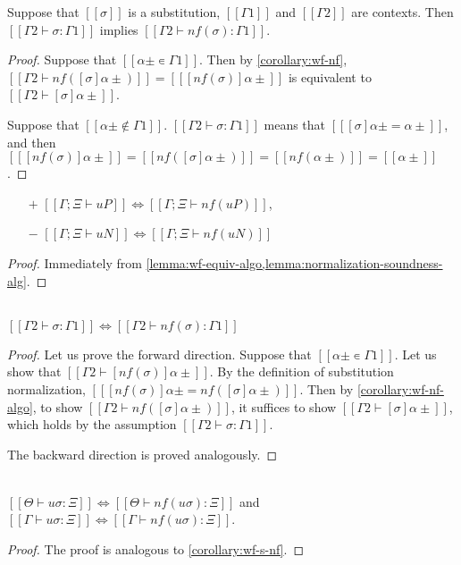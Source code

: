 \begin{lemma}
  \label{lemma:norm-subst-sig}
  Suppose that $[[σ]]$ is a substitution, $[[Γ1]]$ and $[[Γ2]]$ are contexts.
  Then $[[Γ2 ⊢ σ : Γ1]]$ implies $[[Γ2 ⊢ nf(σ) : Γ1]]$.
\end{lemma}
\begin{proof}
  Suppose that $[[α± ∊ {Γ1}]]$. 
  Then by \cref{corollary:wf-nf}, $[[Γ2 ⊢ nf([σ]α±)]] = [[ [nf(σ)]α± ]]$ 
  is equivalent to $[[Γ2 ⊢ [σ]α±]]$.

  Suppose that $[[α± ∉ {Γ1}]]$. 
  $[[Γ2 ⊢ σ : Γ1]]$ means that $[[ [σ]α± = α± ]]$, 
  and then $[[ [nf(σ)]α± ]] = [[nf([σ]α±)]] = [[nf(α±)]] = [[α±]]$.
\end{proof}



\begin{corollary}
  \label{corollary:wf-nf-algo}
  \begin{itemize}
    \item[$+$] $[[Γ; Ξ ⊢ uP]] \iff [[Γ; Ξ ⊢ nf(uP)]]$,
    \item[$-$] $[[Γ; Ξ ⊢ uN]] \iff [[Γ; Ξ ⊢ nf(uN)]]$
  \end{itemize}
\end{corollary}
\begin{proof}
  Immediately from \cref{lemma:wf-equiv-algo,lemma:normalization-soundness-alg}.
\end{proof}

\begin{corollary}
  \label{corollary:wf-s-nf}
  \hfill \\
   $[[Γ2 ⊢ σ : Γ1]] \iff [[Γ2 ⊢ nf(σ) : Γ1]]$
\end{corollary}
\begin{proof}
  Let us prove the forward direction.
  Suppose that $[[α± ∊ {Γ1}]]$.  Let us show that $[[Γ2 ⊢ [nf(σ)]α±]]$.
  By the definition of substitution normalization,
  $[[ [nf(σ)]α± = nf([σ]α±) ]]$. Then by \cref{corollary:wf-nf-algo},
  to show $[[Γ2 ⊢ nf([σ]α±)]]$, it suffices to show $[[Γ2 ⊢ [σ]α±]]$,
  which holds by the assumption $[[Γ2 ⊢ σ : Γ1]]$.

  The backward direction is proved analogously.
\end{proof}

\begin{corollary}
  \label{corollary:norm-subst-sig-algo}
  \hfill \\
  $[[Θ ⊢ uσ : Ξ]] \iff [[Θ ⊢ nf(uσ) : Ξ]]$ and
  $[[Γ ⊢ uσ : Ξ]] \iff [[Γ ⊢ nf(uσ) : Ξ]]$.
\end{corollary}
\begin{proof}
  The proof is analogous to \cref{corollary:wf-s-nf}.
\end{proof}



